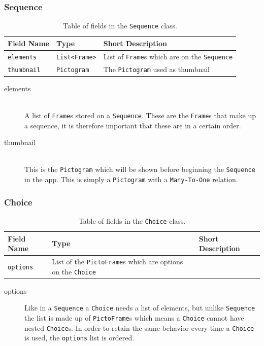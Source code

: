 \subsubsection{Sequence}
\begin{table}[H]
    \footnotesize
    \centering
    \begin{tabularx}{\textwidth}{ l X X }
        Field Name    & Type                                & Short Description                                \\
        \midrule
        \texttt{elements}        & \texttt{List\textless Frame\textgreater} & List of \texttt{Frame}s which are on the \texttt{Sequence} \\
        \texttt{thumbnail}        & \texttt{Pictogram}       & The \texttt{Pictogram} used as thumbnail\\
    \end{tabularx}
    \caption{Table of fields in the \texttt{Sequence} class.}
    \label{tbl:sequence_class}
\end{table}
\begin{description}
	\item[elements] \hfill \\
    A list of \texttt{Frame}s stored on a \texttt{Sequence}.
	These are the \texttt{Frame}s that make up a sequence, it is therefore important that these are in a certain order.
	\item[thumbnail] \hfill \\
    This is the \texttt{Pictogram} which will be shown before beginning the \texttt{Sequence} in the app.
	This is simply a \texttt{Pictogram} with a \texttt{Many-To-One} relation.
\end{description}

\subsubsection{Choice}
\begin{table}[H]
    \footnotesize
    \centering
    \begin{tabularx}{\textwidth}{ l X X }
        Field Name    & Type                                & Short Description                                \\
        \midrule
        \texttt{options}        & List of the \texttt{PictoFrame}s which are options on the \texttt{Choice}\\
    \end{tabularx}
    \caption{Table of fields in the \texttt{Choice} class.}
    \label{tbl:choice_class}
\end{table}
\begin{description}
	\item[options] Like in a \texttt{Sequence} a \texttt{Choice} needs a list of elements, but unlike \texttt{Sequence} the list is made up of \texttt{PictoFrame}s which means a \texttt{Choice} cannot have nested \texttt{Choice}s.
    In order to retain the same behavior every time a \texttt{Choice} is used, the \texttt{options} list is ordered.
\end{description}
